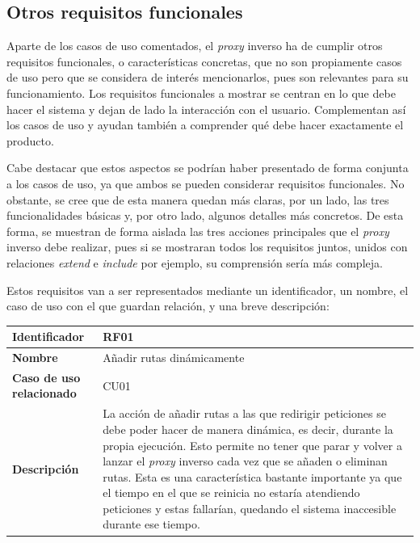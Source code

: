 \documentclass[11pt,spanish,listoffigures]{tfgetsinf}
\begin{document}

		\subsection{Otros requisitos funcionales} \label{requisitosFuncionales}

Aparte de los casos de uso comentados, el \emph{proxy} inverso ha de cumplir otros requisitos funcionales, o características concretas, que no son propiamente casos de uso pero que se considera de interés mencionarlos, pues son relevantes para su funcionamiento. Los requisitos funcionales a mostrar se centran en lo que debe hacer el sistema y dejan de lado la interacción con el usuario. Complementan así los casos de uso y ayudan también a comprender qué debe hacer exactamente el producto.

Cabe destacar que estos aspectos se podrían haber presentado de forma conjunta a los casos de uso, ya que ambos se pueden considerar requisitos funcionales. No obstante, se cree que de esta manera quedan más claras, por un lado, las tres funcionalidades básicas y, por otro lado, algunos detalles más concretos. De esta forma, se  muestran de forma aislada las tres acciones principales que el \emph{proxy} inverso debe realizar, pues si se mostraran todos los requisitos juntos, unidos con relaciones \emph{extend} e \emph{include} por ejemplo, su comprensión sería más compleja.

Estos requisitos van a ser representados mediante un identificador, un nombre, el caso de uso con el que guardan relación, y una breve descripción:

\begin{center} \begin{tabular}{| l | p{9.5cm} |}
\hline
\textbf{Identificador} & RF01
\\ \hline
\textbf{Nombre} & Añadir rutas dinámicamente
\\ \hline
\textbf{Caso de uso relacionado} & CU01
\\ \hline
\textbf{Descripción} & La acción de añadir rutas a las que redirigir peticiones se debe poder hacer de manera dinámica, es decir, durante la propia ejecución. Esto permite no tener que parar y volver a lanzar el \emph{proxy} inverso cada vez que se añaden o eliminan rutas. Esta es una característica bastante importante ya que el tiempo en el que se reinicia no estaría atendiendo peticiones y estas fallarían, quedando el sistema inaccesible durante ese tiempo.
\\ \hline \end{tabular} \end{center}
\end{document}
